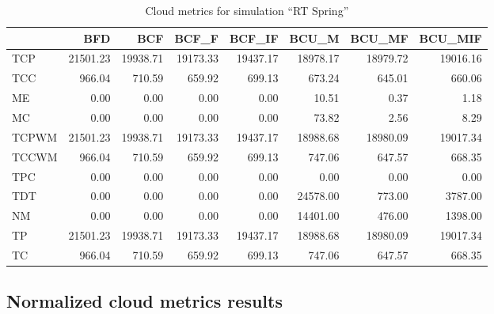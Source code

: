 \begin{table}[ht]
\centering
\begin{tabular}{lrrrrrrr}
\toprule
{} &       BFD &       BCF &     BCF\_F &    BCF\_IF &     BCU\_M &    BCU\_MF &   BCU\_MIF \\
\midrule
TCP   &  21501.23 &  19938.71 &  19173.33 &  19437.17 &  18978.17 &  18979.72 &  19016.16 \\
TCC   &    966.04 &    710.59 &    659.92 &    699.13 &    673.24 &    645.01 &    660.06 \\
ME    &      0.00 &      0.00 &      0.00 &      0.00 &     10.51 &      0.37 &      1.18 \\
MC    &      0.00 &      0.00 &      0.00 &      0.00 &     73.82 &      2.56 &      8.29 \\
TCPWM &  21501.23 &  19938.71 &  19173.33 &  19437.17 &  18988.68 &  18980.09 &  19017.34 \\
TCCWM &    966.04 &    710.59 &    659.92 &    699.13 &    747.06 &    647.57 &    668.35 \\
TPC   &      0.00 &      0.00 &      0.00 &      0.00 &      0.00 &      0.00 &      0.00 \\
TDT   &      0.00 &      0.00 &      0.00 &      0.00 &  24578.00 &    773.00 &   3787.00 \\
NM    &      0.00 &      0.00 &      0.00 &      0.00 &  14401.00 &    476.00 &   1398.00 \\
TP    &  21501.23 &  19938.71 &  19173.33 &  19437.17 &  18988.68 &  18980.09 &  19017.34 \\
TC    &    966.04 &    710.59 &    659.92 &    699.13 &    747.06 &    647.57 &    668.35 \\
\bottomrule
\end{tabular}
\caption{Cloud metrics for simulation "`RT Spring"'}
\end{table}


\FloatBarrier
\subsection{Normalized cloud metrics results}

